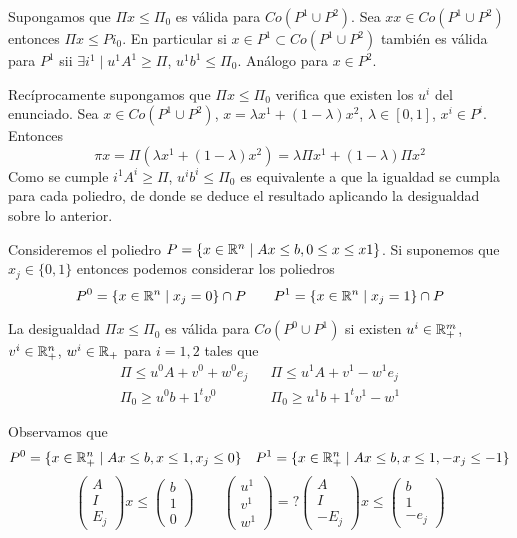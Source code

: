 \documentclass[MIOP.tex]{subfiles}
\begin{document}
\begin{dem}
Supongamos que $\Pi x \leq \Pi_0$ es válida para $ Co(P^1\cup P^2)$. Sea $xx \in Co(P^1\cup P^2)$ entonces $\Pi x \leq Pi_0$. En particular si $x\in P^1 \subset Co(P^1\cup P^2)$ también es válida para $P^1$ sii $\exists i^1\mid u^1 A^1 \geq \Pi$, $u^1 b^1 \leq \Pi_0$. Análogo para $x\in P^2$.

Recíprocamente supongamos que $\Pi x \leq \Pi_0$ verifica que existen los $u^i$ del enunciado. Sea $x\in Co(P^1\cup P^2)$, $x=\lambda x^1 +(1-\lambda)x^2$, $\lambda \in [0,1]$, $x^i\in P^i$. Entonces 
$$
\pi x = \Pi (\lambda x^1 +(1-\lambda)x^2) = \lambda \Pi x^1 +(1-\lambda)\Pi x^2
$$
Como se cumple $i^1 A^i \geq \Pi$, $u^i b^i \leq \Pi_0$ es equivalente a que la igualdad se cumpla para cada poliedro, de donde se deduce el resultado aplicando la desigualdad sobre lo anterior.
\end{dem}

Consideremos el poliedro $P=\{x\in\mathbb{R}^n \mid Ax\leq b, 0\leq x \leq x 1\}$. Si suponemos que $x_j\in\{0,1\}$ entonces podemos considerar los poliedros 
$$P^0=\{x\in\mathbb{R}^n \mid x_j =0\}\cap P \qquad P^1 =\{x\in\mathbb{R}^n \mid x_j=1\}\cap P
$$
\begin{prop}
La desigualdad $\Pi x\leq \Pi_0$ es válida para $Co(P^0 \cup P^1)$ si existen $u^i \in \mathbb{R}^m_+$, $v^i \in \mathbb{R}^n_+$, $w^i\in\mathbb{R}_+$ para $i=1,2$ tales que 
\begin{align*}
\Pi\leq u^0A + v^0 + w^0e_j && \Pi \leq u^1 A + v^1-w^1 e_j\\
\Pi_0 \geq u^0b+1^tv^0 && \Pi_0\geq u^1 b +1^t v^1 -w^1
\end{align*}
\end{prop}
\begin{dem}
Observamos que
$$
P^0=\{x\in\mathbb{R}^n_+\mid Ax \leq b, x\leq 1, x_j \leq 0\} \quad P^1=\{x\in\mathbb{R}^n_+\mid Ax \leq b, x\leq 1, -x_j \leq -1\}
$$
$$
\begin{pmatrix}
A\\
I\\
E_j
\end{pmatrix}x \leq 
\begin{pmatrix}
b\\
1\\
0
\end{pmatrix}
\qquad
\begin{pmatrix}
u^1\\
v^1\\
w^1
\end{pmatrix} =?
\begin{pmatrix}
A\\
I\\
-E_j
\end{pmatrix}x \leq 
\begin{pmatrix}
b\\
1\\
-e_j
\end{pmatrix}
$$
\end{dem}
\end{document}
